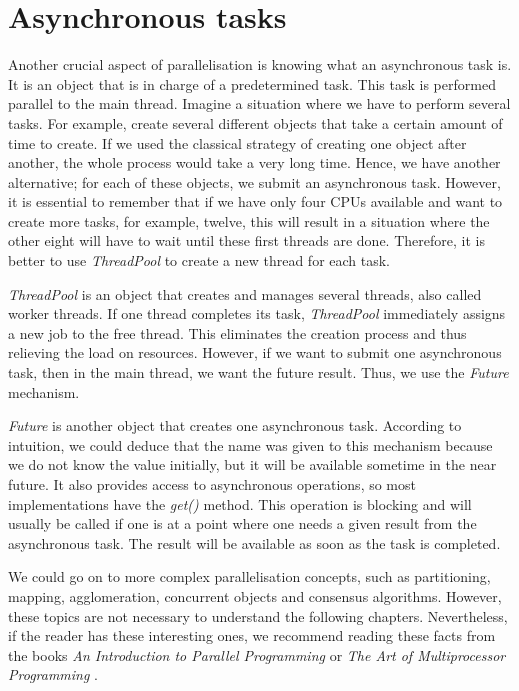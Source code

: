 \section{Asynchronous tasks}
\label{04:asynctaks}

Another crucial aspect of parallelisation is knowing what an asynchronous task is.
It is an object that is in charge of a predetermined task.
This task is performed parallel to the main thread.
Imagine a situation where we have to perform several tasks.
For example, create several different objects that take a certain amount of time to create.
If we used the classical strategy of creating one object after another, the whole process would take a very long time.
Hence, we have another alternative;
for each of these objects, we submit an asynchronous task.
However, it is essential to remember that if we have only four CPUs available and want to create more tasks, for example, twelve, this will result in a situation where the other eight will have to wait until these first threads are done.
Therefore, it is better to use \emph{ThreadPool} to create a new thread for each task.

\emph{ThreadPool} is an object that creates and manages several threads, also called worker threads.
If one thread completes its task, \emph{ThreadPool} immediately assigns a new job to the free thread.
 This eliminates the creation process and thus relieving the load on resources.
 However, if we want to submit one asynchronous task, then in the main thread, we want the future result.
 Thus, we use the \emph{Future} mechanism.

\emph{Future} is another object that creates one asynchronous task.
According to intuition, we could deduce that the name was given to this mechanism because we do not know the value initially, but it will be available sometime in the near future.
It also provides access to asynchronous operations, so most implementations have the \emph{get()} method.
This operation is blocking and will usually be called if one is at a point where one needs a given result from the asynchronous task.
The result will be available as soon as the task is completed.

We could go on to more complex parallelisation concepts, such as partitioning, mapping, agglomeration, concurrent objects and consensus algorithms.
However, these topics are not necessary to understand the following chapters.
Nevertheless, if the reader has these interesting ones, we recommend reading these facts from the books \emph{An Introduction to Parallel Programming} \cite{introductionToParallelProgramming} or \emph{The Art of Multiprocessor Programming} \cite{artOfMultiprocessorProgramming}.

